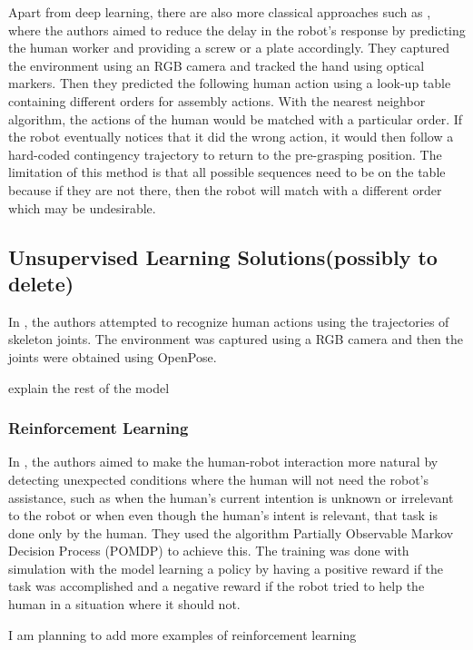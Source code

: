 Apart from deep learning, there are also more classical approaches such as \cite{Maeda2016}, where the authors aimed to reduce the delay in the robot's response by predicting the human worker and providing a screw or a plate accordingly. They captured the environment using an RGB camera and tracked the hand using optical markers. Then they predicted the following human action using a look-up table containing different orders for assembly actions. With the nearest neighbor algorithm, the actions of the human would be matched with a particular order. If the robot eventually notices that it did the wrong action, it would then follow a hard-coded contingency trajectory to return to the pre-grasping position. The limitation of this method is that all possible sequences need to be on the table because if they are not there, then the robot will match with a different order which may be undesirable.

{\color{red}
\subsection{Unsupervised Learning Solutions(possibly to delete)}

In \cite{Kato2018}, the authors attempted to recognize human actions using the trajectories of skeleton joints. The environment was captured using a RGB camera and then the joints were obtained using OpenPose.
}

{\color{red} explain the rest of the model} 
\fi

\subsubsection{Reinforcement Learning}

In \cite{Gorur2018}, the authors aimed to make the human-robot interaction more natural by detecting unexpected conditions where the human will not need the robot's assistance, such as when the human's current intention is unknown or irrelevant to the robot or when even though the human's intent is relevant, that task is done only by the human. They used the algorithm Partially Observable Markov Decision Process (POMDP) to achieve this. The training was done with simulation with the model learning a policy by having a positive reward if the task was accomplished and a negative reward if the robot tried to help the human in a situation where it should not.

{\color{red} I am planning to add more examples of reinforcement learning}

